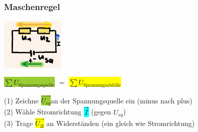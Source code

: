     \subsubsection*{Maschenregel}
    \vspace{-1mm}
    \begin{minipage}{0.49\linewidth}
        \begin{footnotesize}
            \begin{center}
                \vspace{2mm}
                \includegraphics[width = 30mm]{src/images/maschenregel.png}
            \end{center}
        \end{footnotesize}
    \end{minipage}
    \begin{minipage}{0.5\linewidth}
        \begin{scriptsize}
            \begin{center}
            \end{center}
        \end{scriptsize}
    \end{minipage}
    \vspace{1mm}
    \hfill \colorbox{YellowGreen}{$\sum U_\text{Spannungsquelle}$} $=$ \colorbox{Yellow}{$\sum U_\text{Spannungsabfälle}$} 

    (1) Zeichne \colorbox{YellowGreen}{$\overrightarrow{U_{sq}}$}an der Spannungsquelle ein (minus nach plus)
    \\(2) Wähle Stromrichtung \colorbox{Cyan}{$\overrightarrow{I}$} (gegen $U_{sq}$)
    \\(3) Trage \colorbox{Yellow}{$\overrightarrow{U_R}$} an Widerständen (ein gleich wie Stromrichtung)
    \vspace{20mm}